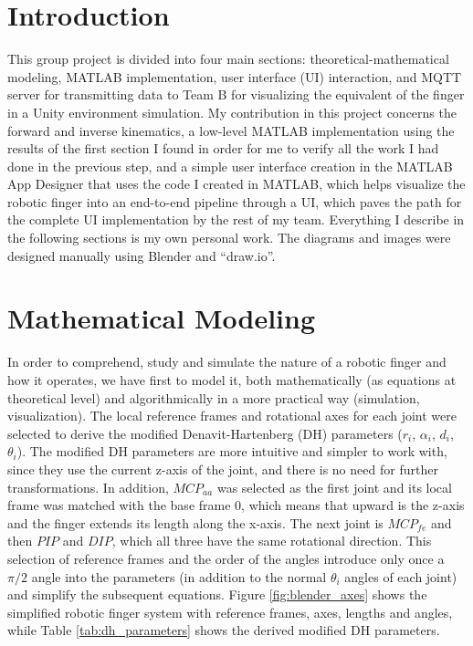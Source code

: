 \documentclass[a4paper,12pt]{article}
\begin{document}
\listoftables
\newpage

\listoffigures
\newpage

\section{Introduction}
This group project is divided into four main sections: theoretical-mathematical modeling, MATLAB implementation, user interface (UI) interaction, and MQTT server for transmitting data to Team B for visualizing the equivalent of the finger in a Unity environment simulation. My contribution in this project concerns the forward and inverse kinematics, a low-level MATLAB implementation using the results of the first section I found in order for me to verify all the work I had done in the previous step, and a simple user interface creation in the MATLAB App Designer that uses the code I created in MATLAB, which helps visualize the robotic finger into an end-to-end pipeline through a UI, which paves the path for the complete UI implementation by the rest of my team. Everything I describe in the following sections is my own personal work. The diagrams and images were designed manually using Blender and ``draw.io''.


\section{Mathematical Modeling}
In order to comprehend, study and simulate the nature of a robotic finger and how it operates, we have first to model it, both mathematically (as equations at theoretical level) and algorithmically in a more practical way (simulation, visualization). The local reference frames and rotational axes for each joint were selected to derive the modified Denavit-Hartenberg (DH) parameters ($r_{i}$, $\alpha_{i}$, $d_i$, $\theta_i$). The modified DH parameters are more intuitive and simpler to work with, since they use the current z-axis of the joint, and there is no need for further transformations. In addition, $MCP_{aa}$ was selected as the first joint and its local frame was matched with the base frame 0, which means that upward is the z-axis and the finger extends its length along the x-axis. The next joint is $MCP_{fe}$ and then $PIP$ and $DIP$, which all three have the same rotational direction. This selection of reference frames and the order of the angles introduce only once a $\pi/2$ angle into the parameters (in addition to the normal $\theta_{i}$ angles of each joint) and simplify the subsequent equations. Figure \ref{fig:blender_axes} shows the simplified robotic finger system with reference frames, axes, lengths and angles, while Table \ref{tab:dh_parameters} shows the derived modified DH parameters.
\end{document}
